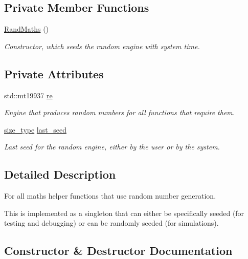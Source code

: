 \subsection*{Private Member Functions}
\begin{DoxyCompactItemize}
\item 
\mbox{\hyperlink{classrcombinator_1_1RandMaths_aa507e7465f9a650d560aa42c7f75310f}{Rand\+Maths}} ()
\begin{DoxyCompactList}\small\item\em Constructor, which seeds the random engine with system time. \end{DoxyCompactList}\end{DoxyCompactItemize}
\subsection*{Private Attributes}
\begin{DoxyCompactItemize}
\item 
std\+::mt19937 \mbox{\hyperlink{classrcombinator_1_1RandMaths_a6b760d6877e9bb7e7001e9e47f38a0b2}{re}}
\begin{DoxyCompactList}\small\item\em Engine that produces random numbers for all functions that require them. \end{DoxyCompactList}\item 
\mbox{\hyperlink{constants_8h_abcd18a5521fc90ff6e7b00e4fee98397}{size\+\_\+type}} \mbox{\hyperlink{classrcombinator_1_1RandMaths_ad50c9491e051cf068d1d2f77b5e80e6f}{last\+\_\+seed}}
\begin{DoxyCompactList}\small\item\em Last seed for the random engine, either by the user or by the system. \end{DoxyCompactList}\end{DoxyCompactItemize}


\subsection{Detailed Description}
For all maths helper functions that use random number generation. 

This is implemented as a singleton that can either be specifically seeded (for testing and debugging) or can be randomly seeded (for simulations). 

\subsection{Constructor \& Destructor Documentation}
\mbox{\label{classrcombinator_1_1RandMaths_aa507e7465f9a650d560aa42c7f75310f}} 
